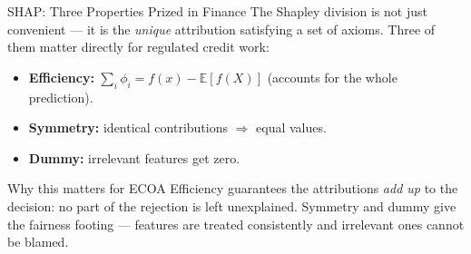 \documentclass[9pt,t]{beamer}
\begin{document}
\begin{frame}{SHAP: Three Properties Prized in Finance}
The Shapley division is not just convenient --- it is the \emph{unique}
attribution satisfying a set of axioms. Three of them matter directly for
regulated credit work:
\begin{itemize}
  \item \textbf{Efficiency:} $\sum_i \phi_i = f(x) - \mathbb{E}[f(X)]$ (accounts
        for the whole prediction).
  \item \textbf{Symmetry:} identical contributions $\Rightarrow$ equal values.
  \item \textbf{Dummy:} irrelevant features get zero.
\end{itemize}

\medskip
\begin{block}{Why this matters for ECOA}
Efficiency guarantees the attributions \emph{add up} to the decision: no part of
the rejection is left unexplained. Symmetry and dummy give the fairness footing ---
features are treated consistently and irrelevant ones cannot be blamed.
\end{block}
\end{frame}
\end{document}
